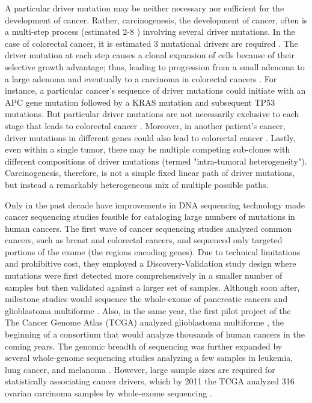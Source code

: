 A particular driver mutation may be neither necessary nor sufficient for the development of cancer. Rather, carcinogenesis, the development of cancer, often is a multi-step process (estimated 2-8 \cite{RN25}) involving several driver mutations. In the case of colorectal cancer, it is estimated 3 mutational drivers are required \cite{RN27}. The driver mutation at each step causes a clonal expansion of cells because of their selective growth advantage; thus, leading to progression from a small adenoma to a large adenoma and eventually to a carcinoma in colorectal cancers \cite{RN26}. For instance, a particular cancer's sequence of driver mutations could initiate with an APC gene mutation followed by a KRAS mutation and subsequent TP53 mutations. But particular driver mutations are not necessarily exclusive to each stage that leads to colorectal cancer \cite{RN26}. Moreover, in another patient's cancer, driver mutations in different genes could also lead to colorectal cancer \cite{RN48}. Lastly, even within a single tumor, there may be multiple competing sub-clones with different compositions of driver mutations (termed "intra-tumoral heterogeneity").  Carcinogenesis, therefore, is not a simple fixed linear path of driver mutations, but instead a remarkably heterogeneous mix of multiple possible paths. 

Only in the past decade have improvements in DNA sequencing technology made cancer sequencing studies feasible for cataloging large numbers of mutations in human cancers. The first wave of cancer sequencing studies \cite{RN2, RN4, RN3} analyzed common cancers, such as breast and colorectal cancers, and sequenced only targeted portions of the exome (the regions encoding genes). Due to technical limitations and prohibitive cost, they employed a Discovery-Validation study design where mutations were first detected more comprehensively in a smaller number of samples but then validated against a larger set of samples. Although soon after, milestone studies would sequence the whole-exome of pancreatic cancers \cite{RN5} and glioblastoma multiforme \cite{RN6}.  Also, in the same year, the first pilot project of the The Cancer Genome Atlas (TCGA) analyzed glioblastoma multiforme \cite{RN7}, the beginning of a consortium that would analyze thousands of human cancers in the coming years. The genomic breadth of sequencing was further expanded by several whole-genome sequencing studies analyzing a few samples in leukemia, lung cancer, and melanoma \cite{RN8, RN9, RN10}. However, large sample sizes are required for statistically associating cancer drivers, which by 2011 the TCGA analyzed 316 ovarian carcinoma samples by whole-exome sequencing \cite{RN11}.

